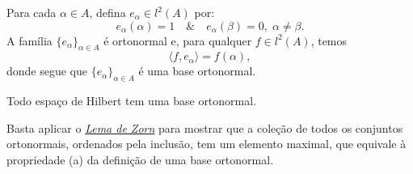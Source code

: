 \documentclass[../functional_analysis.tex]{subfiles}
\begin{document}
Para cada \(\alpha \in A\), defina \(e_{\alpha }\in l^{2}(A)\) por:
\[
	e_{\alpha }(\alpha ) =1 \quad\&\quad e_{\alpha }(\beta )=0,\; \alpha \neq \beta .
\]
A família \(\{e_{\alpha }\}_{\alpha \in A}\) é ortonormal e, para qualquer \(f\in l^{2}(A)\), temos
\[
	\langle f, e_{\alpha } \rangle = f(\alpha ),
\]
donde segue que \(\{e_{\alpha }\}_{\alpha \in A}\) é uma base ortonormal.
\begin{theorem*}
	Todo espaço de Hilbert tem uma base ortonormal.
\end{theorem*}
\begin{proof*}
	Basta aplicar o \hyperlink{zorn_lemma}{\textit{Lema de Zorn}} para mostrar que a coleção de todos os conjuntos ortonormais, ordenados pela inclusão, tem um elemento maximal, que equivale à propriedade (a) da definição de uma base ortonormal. \qedsymbol
\end{proof*}
\end{document}
